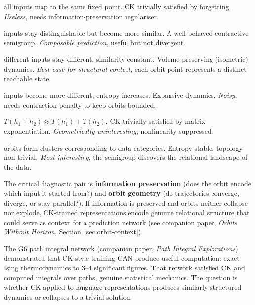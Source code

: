 \documentclass[11pt, a4paper]{article}
\theoremstyle{plain}
\theoremstyle{remark}
\begin{document}
\begin{description}[nosep, leftmargin=1em]
\item[Collapse:] all inputs map to the same fixed point. CK trivially satisfied by forgetting. \emph{Useless}, needs information-preservation regulariser.

\item[Convergent orbits:] inputs stay distinguishable but become more similar. A well-behaved contractive semigroup. \emph{Composable prediction}, useful but not divergent.

\item[Parallel orbits:] different inputs stay different, similarity constant. Volume-preserving (isometric) dynamics. \emph{Best case for structural context}, each orbit point represents a distinct reachable state.

\item[Divergent orbits:] inputs become more different, entropy increases. Expansive dynamics. \emph{Noisy}, needs contraction penalty to keep orbits bounded.

\item[Linear dynamics:] $T(h_1 + h_2) \approx T(h_1) + T(h_2)$. CK trivially satisfied by matrix exponentiation. \emph{Geometrically uninteresting}, nonlinearity suppressed.

\item[Structured basins:] orbits form clusters corresponding to data categories. Entropy stable, topology non-trivial. \emph{Most interesting}, the semigroup discovers the relational landscape of the data.
\end{description}

The critical diagnostic pair is \textbf{information preservation} (does the orbit encode which input it started from?) and \textbf{orbit geometry} (do trajectories converge, diverge, or stay parallel?).
If information is preserved and orbits neither collapse nor explode, CK-trained representations encode genuine relational structure that could serve as context for a prediction network (see companion paper, \emph{Orbits Without Horizon}, Section~\ref{sec:orbit-context}).

The G6 path integral network (companion paper, \emph{Path Integral Explorations}) demonstrated that CK-style training CAN produce useful computation: exact Ising thermodynamics to 3--4 significant figures.
That network satisfied CK and computed integrals over paths, genuine statistical mechanics.
The question is whether CK applied to language representations produces similarly structured dynamics or collapses to a trivial solution.
\end{document}
